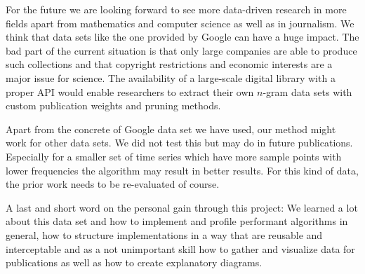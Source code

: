 For the future we are looking forward to see more data-driven research in more fields apart from mathematics and computer science as well as in journalism. We think that data sets like the one provided by Google can have a huge impact. The bad part of the current situation is that only large companies are able to produce such collections and that copyright restrictions and economic interests are a major issue for science. The availability of a large-scale digital library with a proper API would enable researchers to extract their own $n$-gram data sets with custom publication weights and pruning methods.

Apart from the concrete of Google data set we have used, our method might work for other data sets. We did not test this but may do in future publications. Especially for a smaller set of time series which have more sample points with lower frequencies the algorithm may result in better results. For this kind of data, the prior work needs to be re-evaluated of course.

A last and short word on the personal gain through this project: We learned a lot about this data set and how to implement and profile performant algorithms in general, how to structure implementations in a way that are reusable and interceptable and as a not unimportant skill how to gather and visualize data for publications as well as how to create explanatory diagrams.
